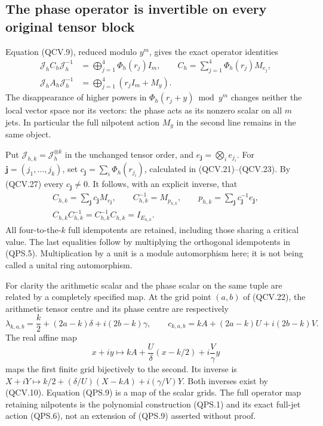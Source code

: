 \subsection{The phase operator is invertible on every original tensor block}

Equation (QCV.9), reduced modulo \(y^m\), gives the exact operator
identities
\[
 \begin{split}
 \mathcal J_h C_h\mathcal J_h^{-1}
    &=\bigoplus_{j=1}^4\Phi_h(r_j)I_m,\qquad
 C_h=\sum_{j=1}^4\Phi_h(r_j)M_{e_j},\\
 \mathcal J_h A_h\mathcal J_h^{-1}
    &=\bigoplus_{j=1}^4(r_jI_m+M_y).
 \end{split}
 \tag{QPS.6}
\]
The disappearance of higher powers in \(\Phi_h(r_j+y)\bmod y^m\)
changes neither the local vector space nor its vectors: the phase
acts as its nonzero scalar on all \(m\) jets. In particular the full
nilpotent action \(M_y\) in the second line remains in the same
object.

Put \(\mathcal J_{h,k}=\mathcal J_h^{\otimes k}\) in the unchanged
tensor order, and \(e_{\mathbf j}=\bigotimes_i e_{j_i}\).
For \(\mathbf j=(j_1,\ldots,j_k)\), set
\(c_{\mathbf j}=\sum_i\Phi_h(r_{j_i})\), calculated in
(QCV.21)--(QCV.23). By (QCV.27) every \(c_{\mathbf j}\ne0\).
It follows, with an explicit inverse, that
\[
 \begin{gathered}
 C_{h,k}=\sum_{\mathbf j}c_{\mathbf j}M_{e_{\mathbf j}},\qquad
 C_{h,k}^{-1}
    =M_{p_{h,k}},\qquad
 p_{h,k}=\sum_{\mathbf j}c_{\mathbf j}^{-1}e_{\mathbf j},\\
 C_{h,k}C_{h,k}^{-1}
    =C_{h,k}^{-1}C_{h,k}=I_{E_{h,k}}.
 \end{gathered}
 \tag{QPS.7}
\]
All four-to-the-\(k\) full idempotents are retained, including those
sharing a critical value. The last equalities follow by multiplying
the orthogonal idempotents in (QPS.5). Multiplication by a unit is
a module automorphism here; it is not being called a unital ring
automorphism.

For clarity the arithmetic scalar and the phase scalar on the same
tuple are related by a completely specified map. At the grid point
\((a,b)\) of (QCV.22), the arithmetic tensor centre and its phase
centre are respectively
\[
 \lambda_{k,a,b}=\frac{k}{2}+(2a-k)\delta+i(2b-k)\gamma,\qquad
 c_{k,a,b}=kA+(2a-k)U+i(2b-k)V.
 \tag{QPS.8}
\]
The real affine map
\[
 x+iy\longmapsto kA+\frac{U}{\delta}(x-k/2)
                           +i\frac{V}{\gamma}y
 \tag{QPS.9}
\]
maps the first finite grid bijectively to the second. Its inverse is
\(X+iY\mapsto k/2+(\delta/U)(X-kA)+i(\gamma/V)Y\).
Both inverses exist by (QCV.10). Equation (QPS.9) is a map of
the scalar grids. The full operator map retaining nilpotents is
the polynomial construction (QPS.1) and its exact full-jet action
(QPS.6), not an extension of (QPS.9) asserted without proof.

